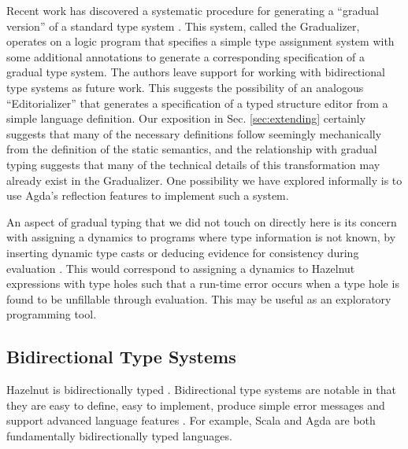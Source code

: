 \documentclass[9pt]{sigplanconf}
\begin{document}
Recent work has discovered a systematic procedure for generating a
``gradual version'' of a standard type
system \cite{DBLP:conf/popl/CiminiS16}. This system, called the
Gradualizer, operates on a logic program that specifies a simple type
assignment system with some additional annotations to generate a
corresponding specification of a gradual type system. The authors leave
support for working with bidirectional type systems as future work. This
suggests the possibility of an analogous ``Editorializer'' that generates a
specification of a typed structure editor from a simple language
definition. Our exposition in Sec. \ref{sec:extending} certainly suggests
that many of the necessary definitions follow seemingly mechanically from
the definition of the static semantics, and the relationship with gradual
typing suggests that many of the technical details of this transformation
may already exist in the Gradualizer. One possibility we have explored
informally is to use Agda's reflection features to implement such a system.

An aspect of gradual typing that we did not touch on directly here is its
concern with assigning a dynamics to programs where type information is not
known, by inserting dynamic type casts \cite{Siek06a} or deducing evidence for consistency during evaluation \cite{Garcia:2016:AGT:2837614.2837670}. This would correspond to assigning
a dynamics to Hazelnut expressions with type holes such that a run-time
error occurs when a type hole is found to be unfillable through evaluation. This 
may be useful as an exploratory programming tool.

\subsection{Bidirectional Type Systems}
Hazelnut is bidirectionally typed \cite{Pierce:2000:LTI:345099.345100,DBLP:conf/icfp/DaviesP00,DBLP:conf/tldi/ChlipalaPH05,bidi-tutorial,odersky2001colored}. Bidirectional type systems are notable in 
that they are easy to define, easy to implement, produce simple error messages and support advanced language features \cite{dunfield2013complete}. For example, Scala \cite{odersky2001colored} and Agda \cite{norell:thesis} are both fundamentally bidirectionally typed languages.
\end{document}
